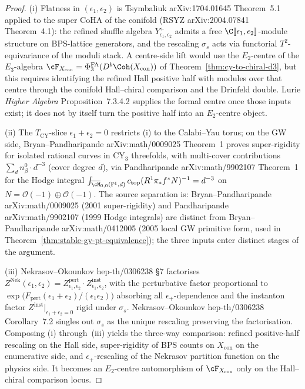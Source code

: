 \begin{proof}
(i) Flatness in $(\epsilon_1, \epsilon_2)$ is Tsymbaliuk
\textup{arXiv:1704.01645} Theorem~5.1 applied to the super CoHA of
the conifold (RSYZ \textup{arXiv:2004.07841} Theorem~4.1): the
refined shuffle algebra $Y^{+}_{\epsilon_1, \epsilon_2}$ admits a
	free $\C[\![\epsilon_1, \epsilon_2]\!]$-module structure on BPS-lattice
	generators, and the rescaling $\sigma_s$ acts via functorial
	$T^{2}$-equivariance of the moduli stack. A centre-side lift would use
	the $E_2$-centre of the $E_3$-algebra
	$\cF_{X_{\mathrm{con}}} = \PhiFA_3(D^b\Coh(X_{\mathrm{con}}))$ of
	Theorem~\ref{thm:cy-to-chiral-d3}, but this requires identifying the
	refined Hall positive half with modules over that centre through the
	conifold Hall--chiral comparison and the Drinfeld double. Lurie
	\emph{Higher Algebra} Proposition~7.3.4.2 supplies the formal centre
	once those inputs exist; it does not by itself turn the positive half
	into an $E_2$-centre object.

(ii) The $T_{\mathrm{CY}}$-slice $\epsilon_1 + \epsilon_2 = 0$
restricts (i) to the Calabi--Yau torus; on the GW side,
Bryan--Pandharipande \textup{arXiv:math/0009025} Theorem~1 proves
super-rigidity for isolated rational curves in CY$_3$ threefolds,
with multi-cover contributions $\sum_d n^{0}_\beta \cdot d^{-3}$
(cover degree $d$), via Pandharipande \textup{arXiv:math/9902107}
Theorem~1 for the Hodge integral $\int_{\overline{\cM}_{0,0}(
\mathbb{P}^1, d)} c_{\mathrm{top}}(R^1 \pi_* f^* N)^{-1} = d^{-3}$ on
$N = \mathcal{O}(-1) \oplus \mathcal{O}(-1)$. The source separation is:
Bryan--Pandharipande \textup{arXiv:math/0009025} (2001 super-rigidity)
and Pandharipande \textup{arXiv:math/9902107} (1999 Hodge integrals)
are distinct from Bryan--Pandharipande \textup{arXiv:math/0412005}
(2005 local GW primitive form, used in
Theorem~\ref{thm:stable-gv-pt-equivalence}); the three inputs enter
distinct stages of the argument.

(iii) Nekrasov--Okounkov \textup{hep-th/0306238} \S7 factorises
$Z^{\mathrm{Nek}}(\epsilon_1, \epsilon_2) =
Z^{\mathrm{pert}}_{\epsilon_1, \epsilon_2} \cdot
Z^{\mathrm{inst}}_{\epsilon_1, \epsilon_2}$, with the perturbative
factor proportional to $\exp\bigl(F_{\mathrm{pert}}(\epsilon_1 +
\epsilon_2) / (\epsilon_1 \epsilon_2)\bigr)$ absorbing all
$\epsilon_+$-dependence and the instanton factor
$Z^{\mathrm{inst}}|_{\epsilon_1 + \epsilon_2 = 0}$ rigid under
$\sigma_s$. Nekrasov--Okounkov \textup{hep-th/0306238}
Corollary~7.2 singles out $\sigma_s$ as the unique rescaling preserving
the factorisation. Composing (i) through~(iii) yields the three-way
comparison: refined positive-half rescaling on the Hall side,
super-rigidity of BPS counts on $X_{\mathrm{con}}$ on the enumerative
side, and $\epsilon_+$-rescaling of the Nekrasov partition function on
the physics side. It becomes an $E_2$-centre automorphism of
$\cF_{X_{\mathrm{con}}}$ only on the Hall--chiral comparison locus.
\end{proof}

